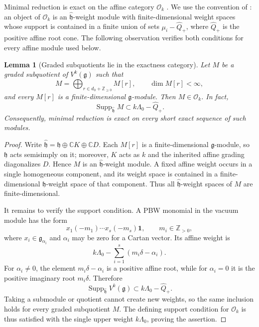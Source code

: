 \documentclass[11pt,reqno]{amsart}
\newtheorem{lemma}[theorem]{Lemma}
\theoremstyle{definition}
\theoremstyle{remark}
\begin{document}
Minimal reduction is exact on the affine category $\mathcal O_k$
\cite[Theorem~6.7.1]{Arakawa2005}.  We use the convention of
\cite[Section~2.12]{Arakawa2005}: an object of $\mathcal O_k$ is an
$\widehat{\mathfrak h}$-weight module with finite-dimensional weight spaces
whose support is contained in a finite union of sets
$\mu_i-\widehat Q_+$, where $\widehat Q_+$ is the positive affine root cone.
The following observation verifies both conditions for every affine module
used below.

\begin{lemma}[Graded subquotients lie in the exactness category]
\label{lem:common-graded-subquotient-category-O}
Let $M$ be a graded subquotient of $V^k(\mathfrak g)$ such that
\[
 M=\bigoplus_{r\in d_0+\mathbb Z_{\ge0}}M[r],\qquad
 \dim M[r]<\infty,
\]
and every $M[r]$ is a finite-dimensional $\mathfrak g$-module.  Then
$M\in\mathcal O_k$.  In fact,
\[
 \operatorname{Supp}_{\widehat{\mathfrak h}}M
 \subset k\Lambda_0-\widehat Q_+.
\]
Consequently, minimal reduction is exact on every short exact sequence of
such modules.
\end{lemma}

\begin{proof}
Write
$\widehat{\mathfrak h}=\mathfrak h\oplus\mathbb CK\oplus\mathbb CD$.
Each $M[r]$ is a finite-dimensional $\mathfrak g$-module, so $\mathfrak h$
acts semisimply on it; moreover, $K$ acts as $k$ and the inherited affine
grading diagonalizes $D$.  Hence $M$ is an
$\widehat{\mathfrak h}$-weight module.  A fixed affine weight occurs in a
single homogeneous component, and its weight space is contained in a
finite-dimensional $\mathfrak h$-weight space of that component.  Thus all
$\widehat{\mathfrak h}$-weight spaces of $M$ are finite-dimensional.

It remains to verify the support condition.  A PBW monomial in the vacuum
module has the form
\[
 x_1(-m_1)\cdots x_s(-m_s)\mathbf1,
 \qquad m_i\in\mathbb Z_{>0},
\]
where $x_i\in\mathfrak g_{\alpha_i}$ and $\alpha_i$ may be zero for a
Cartan vector.  Its affine weight is
\[
 k\Lambda_0-\sum_{i=1}^s(m_i\delta-\alpha_i).
\]
For $\alpha_i\ne0$, the element $m_i\delta-\alpha_i$ is a positive affine
root, while for $\alpha_i=0$ it is the positive imaginary root
$m_i\delta$.  Therefore
\[
 \operatorname{Supp}_{\widehat{\mathfrak h}}V^k(\mathfrak g)
 \subset k\Lambda_0-\widehat Q_+.
\]
Taking a submodule or quotient cannot create new weights, so the same
inclusion holds for every graded subquotient $M$.  The defining support
condition for $\mathcal O_k$ is thus satisfied with the single upper weight
$k\Lambda_0$, proving the assertion.
\end{proof}
\end{document}
